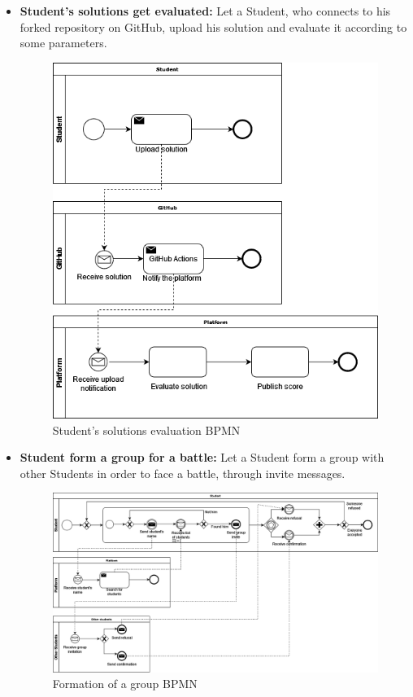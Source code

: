 \documentclass{article}
\begin{document}
{\begin{itemize}
    \item \textbf{Student's solutions get evaluated:} Let a Student, who connects to his forked repository on GitHub, 
    upload his solution and evaluate it according to some parameters.
          \begin{figure}[H]
              \centering
              \includegraphics[scale=0.35]{images/BPMN/BPMN6.png}
              \caption{Student's solutions evaluation BPMN}
              \label{fig:studSolEvalBPMN}
          \end{figure}

    \item \textbf{Student form a group for a battle:} Let a Student form a group with other Students in order to face a battle, through invite messages.
          \begin{figure}[H]
              \centering
              \hspace*{-0.9cm}\includegraphics[scale=0.35]{images/BPMN/BPMN7.png}
              \caption{Formation of a group BPMN}
              \label{fig:groupFormationBPMN}
          \end{figure}
\end{itemize}



}
\end{document}
